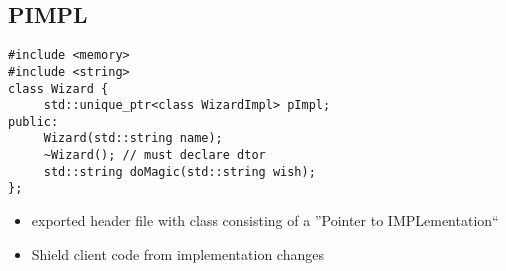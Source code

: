 \subsection{PIMPL}
\begin{lstlisting}
#include <memory>
#include <string>
class Wizard {
	 std::unique_ptr<class WizardImpl> pImpl;
public:
	 Wizard(std::string name);
	 ~Wizard(); // must declare dtor
	 std::string doMagic(std::string wish);
};
\end{lstlisting}
\begin{itemize}
	\item exported header file with class consisting of a ''Pointer to IMPLementation``
	\item Shield client code from implementation changes
\end{itemize}
